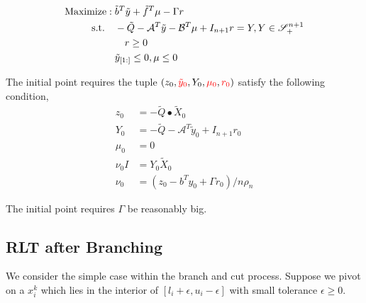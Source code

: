 \documentclass[../main]{subfiles}
\begin{document}
\begin{equation}
    \begin{aligned}
        \mathrm{Maximize:\;}           & \tilde b^T \tilde y + \tilde f^T \mu-\Gamma r                                                 \\
        \mathrm{s.t.} \quad & - \tilde{Q}-\mathcal{A}^T \tilde y - \mathcal{B}^T\mu +I_{n+1} r= Y, Y \in \mathscr S^{n+1}_+ \\
                            & \quad r \ge 0                                                                                 \\
                            & \tilde y_{[1:]} \le 0, \mu \le 0
    \end{aligned}
\end{equation}

The initial point requires the tuple \((z_0, \textcolor{red}{\tilde y_0}, Y_0, \textcolor{red}{\mu_0}, \textcolor{red}{r_0})\) satisfy the following condition,
\begin{align}
    z_0     & = - \tilde Q \bullet \tilde X_0                          \\
    Y_0     & = - \tilde Q   - \mathcal A^T\tilde y_0    + I_{n+1} r_0 \\
    \mu_0   & = 0                                                      \\
    \nu_0 I & = Y_0  \tilde X_0                                        \\
    \nu_0   & = (z_0 - b^Ty_0 + \Gamma r_0) / n \rho_n
\end{align}

The initial point requires \(\Gamma\) be reasonably big.



\subsection{RLT after Branching}
We consider the simple case within the branch and cut process. Suppose we pivot on a \(x_i^k\) which lies in the interior of \(\left[l_i + \epsilon, u_i -\epsilon\right]\) with small tolerance \(\epsilon \ge 0\).
\end{document}
